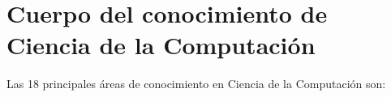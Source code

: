 \chapter{Cuerpo del conocimiento de Ciencia de la Computación}\label{chap:BOK}
\noindent 
Las 18 principales áreas de conocimiento en Ciencia de la Computación son:



